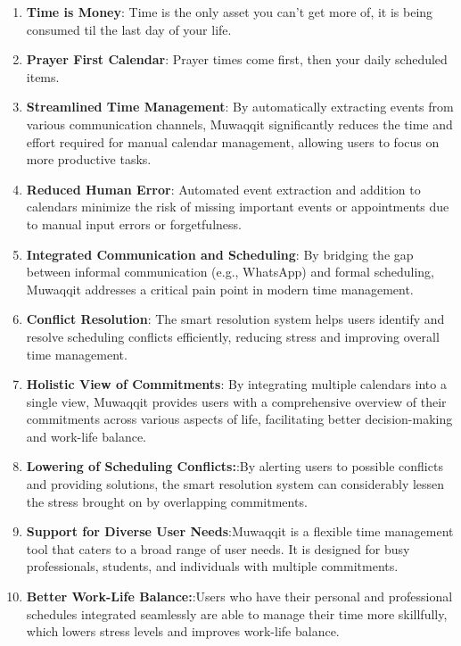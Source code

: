 \documentclass[12pt,a4paper]{article}
\begin{document}
\begin{enumerate}
    \item \textbf{Time is Money}: Time is the only asset you can't get more of, it is being consumed til the last day of your life.
    \item \textbf{Prayer First Calendar}: Prayer times come first, then your daily scheduled items.
    \item \textbf{Streamlined Time Management}: By automatically extracting events from various communication channels, Muwaqqit significantly reduces the time and effort required for manual calendar management, allowing users to focus on more productive tasks.
    \item \textbf{Reduced Human Error}: Automated event extraction and addition to calendars minimize the risk of missing important events or appointments due to manual input errors or forgetfulness.
    \item \textbf{Integrated Communication and Scheduling}: By bridging the gap between informal communication (e.g., WhatsApp) and formal scheduling, Muwaqqit addresses a critical pain point in modern time management.
    \item \textbf{Conflict Resolution}: The smart resolution system helps users identify and resolve scheduling conflicts efficiently, reducing stress and improving overall time management.
    \item \textbf{Holistic View of Commitments}: By integrating multiple calendars into a single view, Muwaqqit provides users with a comprehensive overview of their commitments across various aspects of life, facilitating better decision-making and work-life balance.
    \item \textbf{Lowering of Scheduling Conflicts:}:By alerting users to possible conflicts and providing solutions, the smart resolution system can considerably lessen the stress brought on by overlapping commitments.
    \item \textbf{Support for Diverse User Needs}:Muwaqqit is a flexible time management tool that caters to a broad range of user needs. It is designed for busy professionals, students, and individuals with multiple commitments.
    \item \textbf{Better Work-Life Balance:}:Users who have their personal and professional schedules integrated seamlessly are able to manage their time more skillfully, which lowers stress levels and improves work-life balance.
\end{enumerate}
\end{document}
